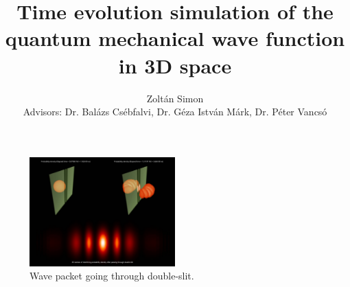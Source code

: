 \documentclass[11pt]{article}
\title{Time evolution simulation of the quantum mechanical wave function in 3D space}
\author{Zoltán Simon\\[1cm]{\small Advisors: Dr. Balázs Csébfalvi, Dr. Géza István Márk, Dr. Péter Vancsó}}
\begin{document}
	
	\maketitle
	
	\begin{figure}[H]
		\centering
		\includegraphics[width=0.5\textwidth]{"figures/preview_image.jpeg"}
		\caption{Wave packet going through double-slit.}
		\label{fig:penetrating_potential}
	\end{figure}
	\thispagestyle{empty}
	\pagebreak
	
	\tableofcontents
	
	\pagebreak

	

	\pagebreak
	
	
	
	
	
	

	

	

		

		

	
	
\end{document}
